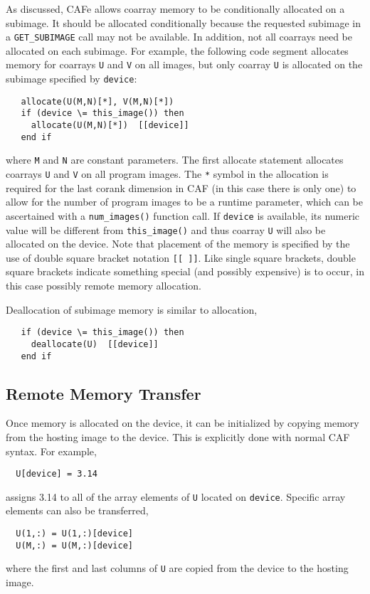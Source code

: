 As discussed, CAFe allows coarray memory to be conditionally allocated on a subimage.
It should be allocated conditionally because the requested subimage in a \texttt{GET\_SUBIMAGE}
call may not be available.  In addition, not all coarrays need be allocated on each
subimage.  For example, the following code segment allocates memory for coarrays
\texttt{U} and \texttt{V} on all images, but only coarray \texttt{U} is allocated on
the subimage specified by \texttt{device}:
\begin{verbatim}
   allocate(U(M,N)[*], V(M,N)[*])
   if (device \= this_image()) then
     allocate(U(M,N)[*])  [[device]]
   end if
\end{verbatim}
where \texttt{M} and \texttt{N} are constant parameters.  The first allocate statement
allocates coarrays \texttt{U} and \texttt{V} on all program images.  The \texttt{*} symbol
in the allocation is required for the last corank dimension in CAF (in this case there is
only one) to allow for the number of program images to be a runtime parameter, which can
be ascertained with a \texttt{num\_images()} function call.  If \texttt{device} is
available, its numeric value will be different from \texttt{this\_image()} and thus
coarray \texttt{U} will also be allocated on the device.  Note that placement of the
memory is specified by the use of double square bracket notation \texttt{[[ ]]}.  Like
single square brackets, double square brackets indicate something special (and possibly
expensive) is to occur, in this case possibly remote memory allocation.

Deallocation of subimage memory is similar to allocation,
\begin{verbatim}
   if (device \= this_image()) then
     deallocate(U)  [[device]]
   end if
\end{verbatim}


\subsection{Remote Memory Transfer}

Once memory is allocated on the device, it can be initialized by copying memory from the
hosting image to the device.  This is explicitly done with normal CAF syntax.  For example,
\begin{verbatim}
  U[device] = 3.14
\end{verbatim}
assigns 3.14 to all of the array elements of \texttt{U} located on \texttt{device}.
Specific array elements can also be transferred, 
\begin{verbatim}
  U(1,:) = U(1,:)[device]
  U(M,:) = U(M,:)[device]
\end{verbatim}
where the first and last columns of \texttt{U} are copied from the device to the hosting image.

